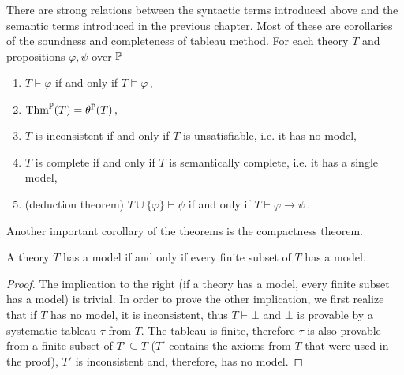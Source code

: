 There are strong relations between the syntactic terms introduced above and the semantic terms introduced in the previous chapter. Most of these are corollaries of the soundness and completeness of tableau method. For each theory $T$ and propositions $\varphi, \psi$ over $\mathbb{P}$ 
\begin{enumerate}
	\item $T \vdash \varphi$ if and only if $T \vDash \varphi\,,$
	\item $\operatorname{Thm}^\mathbb{P}(T) = \theta^\mathbb{P}(T)\,,$
	\item $T$ is inconsistent if and only if $T$ is unsatisfiable, i.e. it has no model,
	\item $T$ is complete if and only if $T$ is semantically complete, i.e. it has a single model,
	\item (deduction theorem) $T \cup \{\varphi\} \vdash \psi$ if and only if $T \vdash \varphi \to \psi\,.$
\end{enumerate}

Another important corollary of the theorems is the compactness theorem.

\begin{theorem}
A theory $T$ has a model if and only if every finite subset of $T$ has a model.
\end{theorem}
\begin{proof}
The implication to the right (if a theory has a model, every finite subset has a model) is trivial. In order to prove the other implication, we first realize that if $T$ has no model, it is inconsistent, thus $T \vdash \bot$ and $\bot$ is provable by a systematic tableau $\tau$ from $T$. The tableau is finite, therefore $\tau$ is also provable from a finite subset of $T' \subseteq T$ ($T'$ contains the axioms from $T$ that were used in the proof), $T'$ is inconsistent and, therefore, has no model.
\end{proof}

